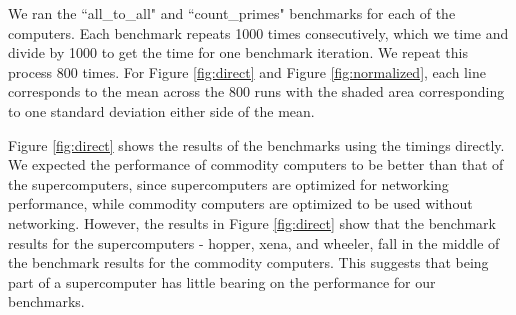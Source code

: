 \documentclass{article}
\begin{document}
We ran the ``all\_to\_all" and ``count\_primes" benchmarks for each of the computers. Each benchmark repeats 1000 times consecutively, which we time and divide by 1000 to get the time for one benchmark iteration. We repeat this process 800 times. For Figure \ref{fig:direct} and Figure \ref{fig:normalized}, each line corresponds to the mean across the 800 runs with the shaded area corresponding to one standard deviation either side of the mean.

Figure \ref{fig:direct} shows the results of the benchmarks using the timings directly. We expected the performance of commodity computers to be better than that of the supercomputers, since supercomputers are optimized for networking performance, while commodity computers are optimized to be used without networking. However, the results in Figure \ref{fig:direct} show that the benchmark results for the supercomputers - hopper, xena, and wheeler, fall in the middle of the benchmark results for the commodity computers. This suggests that being part of a supercomputer has little bearing on the performance for our benchmarks.
\end{document}
